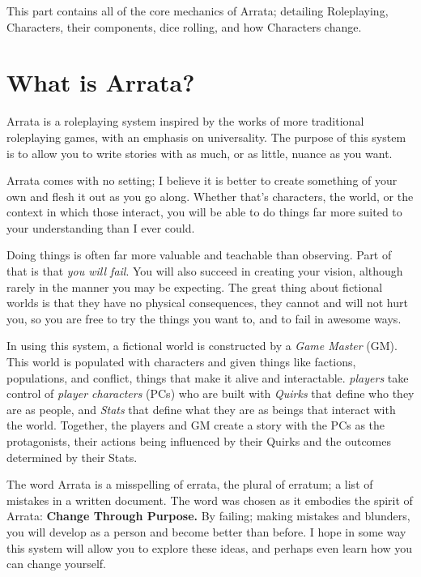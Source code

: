 \documentclass[../main.tex]{subfiles}
\begin{document}
    This part contains all of the core mechanics of Arrata; detailing Roleplaying, Characters, their components, dice rolling, and how Characters change.

    \section{What is Arrata?}

    \thispagestyle{plain}

    Arrata is a roleplaying system inspired by the works of more traditional roleplaying games, with an emphasis on universality. The purpose of this system is to allow you to write stories with as much, or as little, nuance as you want.

    Arrata comes with no setting; I believe it is better to create something of your own and flesh it out as you go along. Whether that's characters, the world, or the context in which those interact, you will be able to do things far more suited to your understanding than I ever could.
    
    Doing things is often far more valuable and teachable than observing. Part of that is that {\em you will fail}. You will also succeed in creating your vision, although rarely in the manner you may be expecting. The great thing about fictional worlds is that they have no physical consequences, they cannot and will not hurt you, so you are free to try the things you want to, and to fail in awesome ways.

    In using this system, a fictional world is constructed by a {\em Game Master} (GM). This world is populated with characters and given things like factions, populations, and conflict, things that make it alive and interactable. {\em players} take control of {\em player characters} (PCs) who are built with {\em Quirks} that define who they are as people, and {\em Stats} that define what they are as beings that interact with the world. Together, the players and GM create a story with the PCs as the protagonists, their actions being influenced by their Quirks and the outcomes determined by their Stats.

    The word Arrata is a misspelling of errata, the plural of erratum; a list of mistakes in a written document. The word was chosen as it embodies the spirit of Arrata: \textbf{Change Through Purpose.} By failing; making mistakes and blunders, you will develop as a person and become better than before. I hope in some way this system will allow you to explore these ideas, and perhaps even learn how you can change yourself.
\end{document}
